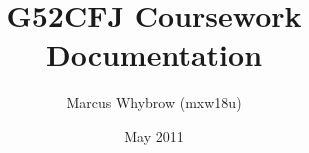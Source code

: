 \documentclass[a4paper,11pt]{report}
\begin{document}
\title{G52CFJ Coursework Documentation}
\author{Marcus Whybrow (mxw18u)}
\date{May 2011}
\maketitle





\end{document}
